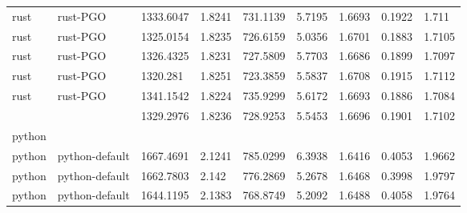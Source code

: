 \begin{longtable}[h]{|lllllllll|}
rust           & rust-PGO               & 1333.6047                 & 1.8241                                                               & 731.1139              & 5.7195           & 1.6693           & 0.1922       & 1.711         \\
rust           & rust-PGO               & 1325.0154                 & 1.8235                                                               & 726.6159              & 5.0356           & 1.6701           & 0.1883       & 1.7105        \\
rust           & rust-PGO               & 1326.4325                 & 1.8231                                                               & 727.5809              & 5.7703           & 1.6686           & 0.1899       & 1.7097        \\
rust           & rust-PGO               & 1320.281                  & 1.8251                                                               & 723.3859              & 5.5837           & 1.6708           & 0.1915       & 1.7112        \\
rust           & rust-PGO               & 1341.1542                 & 1.8224                                                               & 735.9299              & 5.6172           & 1.6693           & 0.1886       & 1.7084        \\
               &                        & 1329.2976                 & 1.8236                                                               & 728.9253              & 5.5453           & 1.6696           & 0.1901       & 1.7102        \\
python         &                        &                           &                                                                      &                       &                  &                  &              &               \\
python         & python-default         & 1667.4691                 & 2.1241                                                               & 785.0299              & 6.3938           & 1.6416           & 0.4053       & 1.9662        \\
python         & python-default         & 1662.7803                 & 2.142                                                                & 776.2869              & 5.2678           & 1.6468           & 0.3998       & 1.9797        \\
python         & python-default         & 1644.1195                 & 2.1383                                                               & 768.8749              & 5.2092           & 1.6488           & 0.4058       & 1.9764        \\

\end{longtable}

